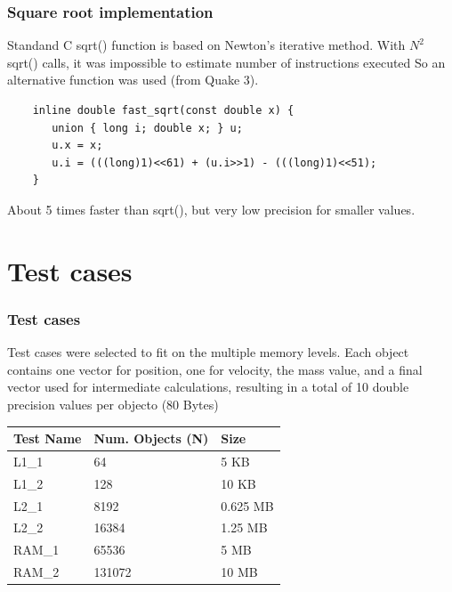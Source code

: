 \documentclass{beamer}
\begin{document}
\begin{frame}[fragile]
	\frametitle{Square root implementation}

	Standand C sqrt() function is based on Newton's iterative method.
	With $N^{2}$ sqrt() calls, it was impossible to estimate number of instructions executed
	So an alternative function was used (from Quake 3).

	\begin{lstlisting}
	inline double fast_sqrt(const double x) {
	   union { long i; double x; } u;
	   u.x = x;
	   u.i = (((long)1)<<61) + (u.i>>1) - (((long)1)<<51);
	}
	\end{lstlisting}

	About 5 times faster than sqrt(), but very low precision for smaller values.

\end{frame}

\section{Test cases}
\begin{frame}
	\frametitle{Test cases}

	Test cases were selected to fit on the multiple memory levels.
	Each object contains one vector for position, one for velocity, the mass value, and a final vector used for intermediate calculations, resulting in a total of 10 double precision values per objecto (80 Bytes)

	\begin{center}
		\begin{tabular}{|l|l|l|}
			\hline
			\textbf{Test Name}	&	\textbf{Num. Objects (N)}		&	\textbf{Size}	\\
			\hline
			L1\_1				&	64				&	5 KB			\\
			L1\_2				&	128				&	10 KB			\\
			L2\_1				&	8192			&	0.625 MB		\\
			L2\_2				&	16384			&	1.25 MB			\\
			RAM\_1				&	65536			&	5 MB			\\
			RAM\_2				&	131072			&	10 MB			\\
			\hline
		\end{tabular}
	\end{center}
\end{frame}
\end{document}
